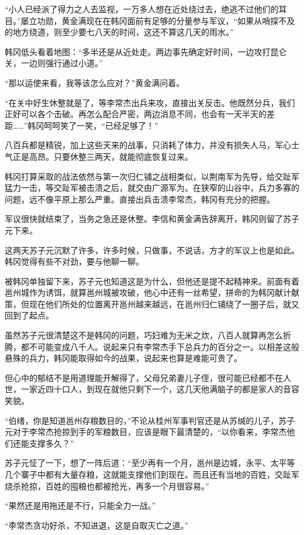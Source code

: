 “小人已经派了得力之人去监视，一万多人想在近处绕过去，绝逃不过他们的耳目。”屡立功勋，黄金满现在在韩冈面前有足够的分量参与军议，“如果从哨探不及的地方绕道，则至少要七八天的时间，这还不算这几天的雨水。”

韩冈低头看着地图：“多半还是从近处走。两边事先确定好时间，一边攻打昆仑关，一边则强行通过小道。”

“那以运使来看，我等该怎么应对？”黄金满问着。

“在关中好生休整就是了，等李常杰出兵来攻，直接出关反击。他既然分兵，我们正好可以各个击破。再怎么配合严密，两边消息不同，也会有一天半天的差距……”韩冈呵呵笑了一笑，“已经足够了！”

八百兵都是精锐，加上这些天来的战事，只消耗了体力，并没有损失人马，军心士气正是高昂。只要休整三两天，就能彻底恢复过来。

韩冈打算采取的战法依然与第一次归仁铺之战相类似，以荆南军为先导，给交趾军猛力一击，等交趾军被击溃之后，就交由广源军为。在狭窄的山谷中，兵力多寡的问题，远不像平原上那么严重。直接出兵击溃李常杰，韩冈有充分的把握。

军议很快就结束了，当务之急还是休整。李信和黄金满告辞离开，韩冈则留了苏子元下来。

这两天苏子元沉默了许多，许多时候，只做事，不说话，方才的军议上也是如此。韩冈觉得有些不对劲，要与他聊一聊。

被韩冈单独留下来，苏子元也知道这是为什么，但他还是提不起精神来。前面有着邕州城作为诱饵，就算邕州城被攻破，他心中还有一丝希望，拼命的为韩冈献计献策，但现在他们所处的位置离开邕州越来越远，在邕州归仁铺绕了一圈子后，就又回到了起点。

虽然苏子元很清楚这不是韩冈的问题，巧妇难为无米之炊，八百人就算再怎么折腾，都不可能变成八千人。说起来只有李常杰手下总兵力的百分之一。以相差这般悬殊的兵力，韩冈能取得如今的战果，说起来也算是难能可贵了。

但心中的郁结不是用道理能开解得了，父母兄弟妻儿子侄，很可能已经都不在人世，一家近四十口人，到现在就他只剩下一个，这几天他满脑子的都是家人的音容笑貌。

“伯绪，你是知道邕州存粮数目的，”不论从桂州军事判官还是从苏缄的儿子，苏子元对于李常杰抢掠到手的军粮数目，应该是眼下最清楚的，“以你看来，李常杰他们还能支撑多久？”

苏子元怔了一下，想了一阵后道：“至少再有一个月，邕州是边城，永平、太平等几个寨子中都有大量存粮，这就能支撑他们到现在。而且还有当地的百姓，交趾军烧杀抢掠，百姓的囤粮也都被抢光，再多一个月很容易。”

“果然还是用拖还是不行，只能全力一战。”

“李常杰贪功好杀，不知进退，这是自取灭亡之道。”

